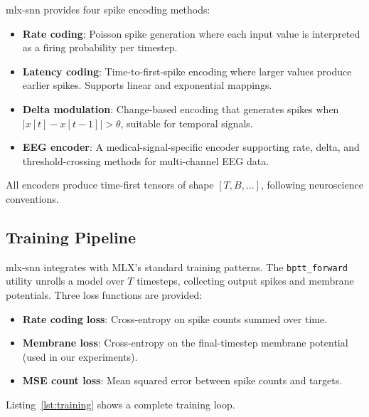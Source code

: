 \documentclass[11pt]{article}
\begin{document}
mlx-snn provides four spike encoding methods:

\begin{itemize}[nosep]
    \item \textbf{Rate coding}: Poisson spike generation where each input value is interpreted as a firing probability per timestep.
    \item \textbf{Latency coding}: Time-to-first-spike encoding where larger values produce earlier spikes. Supports linear and exponential mappings.
    \item \textbf{Delta modulation}: Change-based encoding that generates spikes when $|x[t] - x[t-1]| > \theta$, suitable for temporal signals.
    \item \textbf{EEG encoder}: A medical-signal-specific encoder supporting rate, delta, and threshold-crossing methods for multi-channel EEG data.
\end{itemize}

All encoders produce time-first tensors of shape $[T, B, \ldots]$, following neuroscience conventions.

\subsection{Training Pipeline}

mlx-snn integrates with MLX's standard training patterns. The \texttt{bptt\_forward} utility unrolls a model over $T$ timesteps, collecting output spikes and membrane potentials. Three loss functions are provided:

\begin{itemize}[nosep]
    \item \textbf{Rate coding loss}: Cross-entropy on spike counts summed over time.
    \item \textbf{Membrane loss}: Cross-entropy on the final-timestep membrane potential (used in our experiments).
    \item \textbf{MSE count loss}: Mean squared error between spike counts and targets.
\end{itemize}

\noindent Listing~\ref{lst:training} shows a complete training loop.
\end{document}
